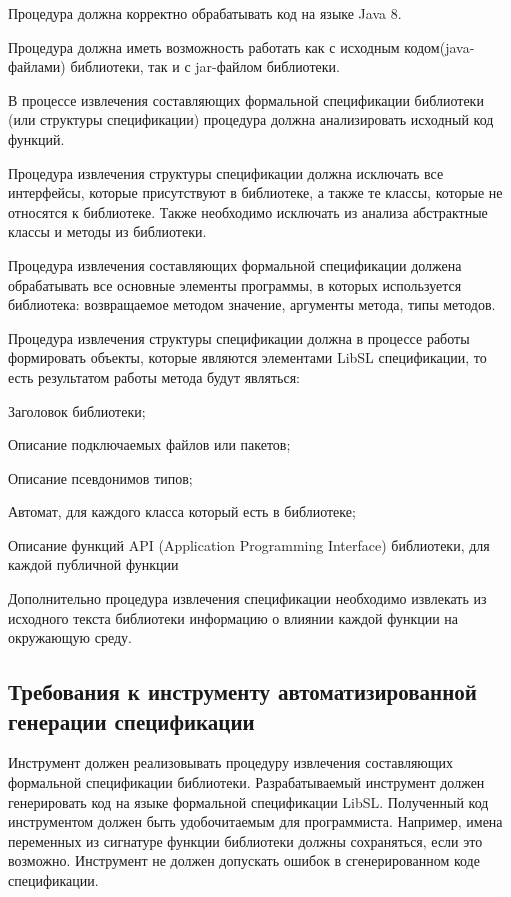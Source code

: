Процедура должна корректно обрабатывать код на языке Java 8.

Процедура должна иметь возможность работать как с исходным кодом(java-файлами) библиотеки, так и с jar-файлом библиотеки.

В процессе извлечения составляющих формальной спецификации библиотеки (или структуры спецификации) процедура должна анализировать исходный код функций.

Процедура извлечения структуры спецификации должна исключать все интерфейсы, которые присутствуют в библиотеке, а также те классы, которые не относятся к библиотеке.
Также необходимо исключать из анализа абстрактные классы и методы из библиотеки.

Процедура извлечения составляющих формальной спецификации должена обрабатывать все основные элементы программы, в которых используется библиотека: возвращаемое методом значение, аргументы метода, типы методов.

Процедура извлечения структуры спецификации должна в процессе работы формировать объекты, которые являются элементами LibSL спецификации, то есть результатом работы метода будут являться:
%
\begin{itemize*}
\item Заголовок библиотеки;
\item Описание подключаемых файлов или пакетов;
\item Описание псевдонимов типов;
\item Автомат, для каждого класса который есть в библиотеке;
\item Описание функций API (Application Programming Interface) библиотеки, для каждой публичной функции
\end{itemize*}
%

Дополнительно процедура извлечения спецификации необходимо извлекать из исходного текста библиотеки информацию о влиянии каждой функции на окружающую среду.

\subsection{Требования к инструменту автоматизированной генерации спецификации}

Инструмент должен реализовывать процедуру извлечения составляющих формальной спецификации библиотеки.
Разрабатываемый инструмент должен генерировать код на языке формальной спецификации LibSL.
Полученный код инструментом должен быть удобочитаемым для программиста. Например, имена переменных из сигнатуре функции библиотеки должны сохраняться, если это возможно.
Инструмент не должен допускать ошибок в сгенерированном коде спецификации.

